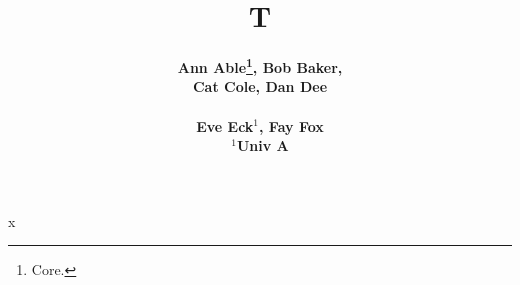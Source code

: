 \documentclass{article}
\title{T}
\author{\bf Ann Able\thanks{Core.}, Bob Baker, \\\bf Cat Cole, Dan Dee \\ \\\bf Eve Eck$^{1}$, Fay Fox \\ $^{1}$Univ A}
\begin{document}
\maketitle
x
\end{document}
